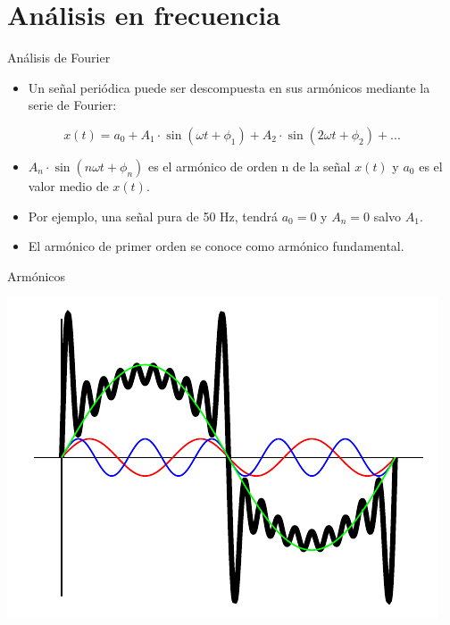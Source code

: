\documentclass[xcolor={usenames,svgnames,dvipsnames}]{beamer}
\begin{document}
\section{Análisis en frecuencia}
\label{sec:orgbd64d56}
\begin{frame}[label={sec:org4c37dee}]{Análisis de Fourier}
\begin{itemize}
\item Un señal periódica puede ser descompuesta en sus armónicos mediante la serie de Fourier:
\end{itemize}
$$x(t)=a_{0}+A_{1}\cdot\sin(\omega t+\phi_{1})+A_{2}\cdot\sin(2\omega
  t+\phi_{2})+...$$

\begin{itemize}
\item \(A_{n}\cdot\sin(n\omega t+\phi_{n})\) es el armónico de orden n de la señal \(x(t)\) y \(a_{0}\) es el valor medio de \(x(t)\).

\item Por ejemplo, una señal pura de 50 Hz, tendrá \(a_{0}=0\) y \(A_{n}=0\) salvo \(A_{1}\).

\item El armónico de primer orden se conoce como armónico fundamental.
\end{itemize}
\end{frame}

\begin{frame}[label={sec:orgb5c81fb}]{Armónicos}
\begin{center}
\includegraphics[width=.9\linewidth]{../figs/Armonicos.pdf}
\end{center}
\end{frame}
\end{document}
